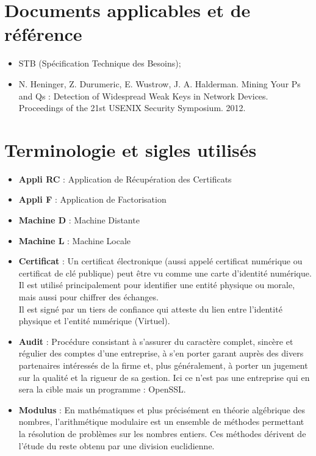 \documentclass[a4paper,11pt,french]{article}
\begin{document}
\section{Documents applicables et de référence}
\begin{itemize}
\item STB (Spécification Technique des Besoins);
\item N. Heninger, Z. Durumeric, E. Wustrow, J. A. Halderman. Mining Your Ps and Qs : Detection of
Widespread Weak Keys in Network Devices. Proceedings of the 21st USENIX Security Symposium.
2012.
\end{itemize}

\section{Terminologie et sigles utilisés}
\begin{itemize}
	\item \textbf{Appli RC} : Application de Récupération des Certificats
	\item \textbf{Appli F} : Application de Factorisation
	\item \textbf{Machine D} : Machine Distante
	\item \textbf{Machine L} : Machine Locale
	\item \textbf{Certificat} : Un certificat électronique (aussi appelé certificat numérique ou certificat de clé publique) peut être vu comme une carte d'identité numérique. Il est utilisé principalement pour identifier une entité physique ou morale, mais aussi pour chiffrer des échanges. \\Il est signé par un tiers de confiance qui atteste du lien entre l'identité physique et l'entité numérique (Virtuel).
	\item \textbf{Audit} : Procédure consistant à s'assurer du caractère complet, sincère et régulier des comptes d'une entreprise, à s'en porter garant auprès des divers partenaires intéressés de la firme et, plus généralement, à porter un jugement sur la qualité et la rigueur de sa gestion. Ici ce n'est pas une entreprise qui en sera la cible mais un programme : OpenSSL.
	\item \textbf{Modulus} : En mathématiques et plus précisément en théorie algébrique des nombres, l’arithmétique modulaire est un ensemble de méthodes permettant la résolution de problèmes sur les nombres entiers. Ces méthodes dérivent de l’étude du reste obtenu par une division euclidienne.
\end{itemize}
\end{document}
